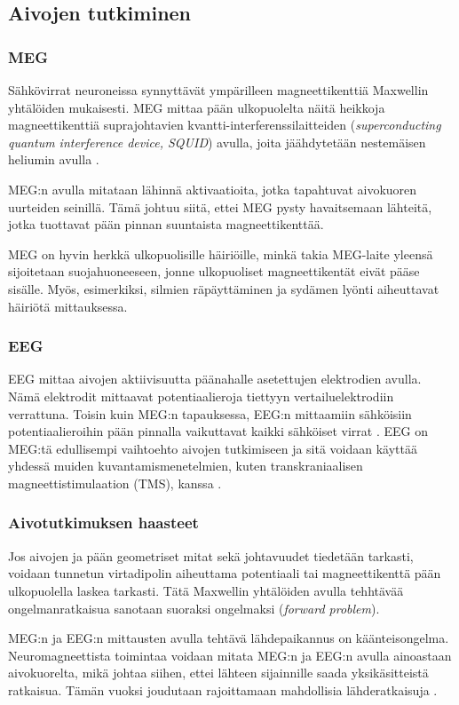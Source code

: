 \subsection{Aivojen tutkiminen}

\subsubsection{MEG}
Sähkövirrat neuroneissa synnyttävät ympärilleen magneettikenttiä Maxwellin yhtälöiden mukaisesti. MEG mittaa pään ulkopuolelta näitä heikkoja magneettikenttiä suprajohtavien kvantti-interferenssilaitteiden (\textit{superconducting quantum interference device, SQUID}) avulla, joita jäähdytetään nestemäisen heliumin avulla \citep{HariMEGprimer}.

MEG:n avulla mitataan lähinnä aktivaatioita, jotka tapahtuvat aivokuoren uurteiden seinillä. Tämä johtuu siitä, ettei MEG pysty havaitsemaan lähteitä, jotka tuottavat pään pinnan suuntaista magneettikenttää. \citep{hansen2010meg}

MEG on hyvin herkkä ulkopuolisille häiriöille, minkä takia MEG-laite yleensä sijoitetaan suojahuoneeseen, jonne ulkopuoliset magneettikentät eivät pääse sisälle. Myös, esimerkiksi, silmien räpäyttäminen ja sydämen lyönti aiheuttavat häiriötä mittauksessa. \citep{Hamalainen1993MagnetoencephalographytheoryBrain}

\subsubsection{EEG}
EEG mittaa aivojen aktiivisuutta päänahalle asetettujen elektrodien avulla. Nämä elektrodit mittaavat potentiaalieroja tiettyyn vertailuelektrodiin verrattuna. \citep{Michel2004EEGImaging} Toisin kuin MEG:n tapauksessa, EEG:n mittaamiin sähköisiin potentiaalieroihin pään pinnalla vaikuttavat kaikki sähköiset virrat \citep{HariMEGprimer}. EEG on MEG:tä edullisempi vaihtoehto aivojen tutkimiseen ja sitä voidaan käyttää yhdessä muiden kuvantamismenetelmien, kuten transkraniaalisen magneettistimulaation (TMS), kanssa \citep[s. 11]{HariMEGprimer}. 

\subsubsection{Aivotutkimuksen haasteet}
Jos aivojen ja pään geometriset mitat sekä johtavuudet tiedetään tarkasti, voidaan tunnetun virtadipolin aiheuttama potentiaali tai magneettikenttä pään ulkopuolella laskea tarkasti. Tätä Maxwellin yhtälöiden avulla tehhtävää ongelmanratkaisua sanotaan suoraksi ongelmaksi (\textit{forward problem}). \citep{Hamalainen1993MagnetoencephalographytheoryBrain}

MEG:n ja EEG:n mittausten avulla tehtävä lähdepaikannus on käänteisongelma. Neuromagneettista toimintaa voidaan mitata MEG:n ja EEG:n avulla ainoastaan aivokuorelta, mikä johtaa siihen, ettei lähteen sijainnille saada yksikäsitteistä ratkaisua. Tämän vuoksi joudutaan rajoittamaan mahdollisia lähderatkaisuja \citep[s. 2]{hansen2010meg}.

